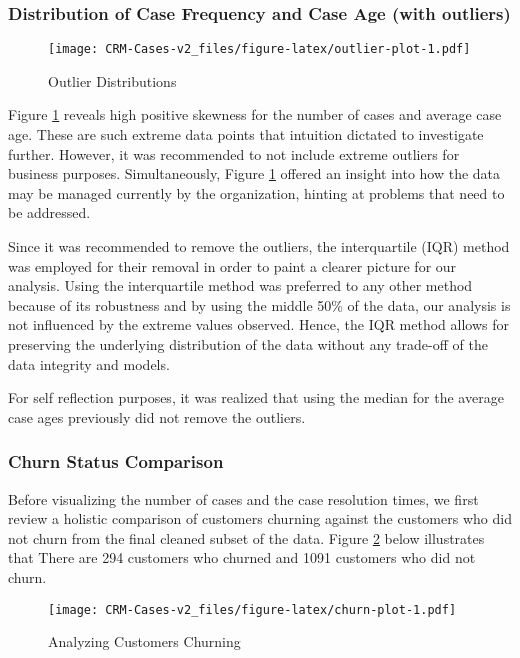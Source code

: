 \documentclass[
]{article}
\begin{document}
\subsubsection{Distribution of Case Frequency and Case Age (with outliers)}\label{distribution-of-case-frequency-and-case-age-with-outliers}

\begin{figure}
\centering
\texttt{[image: CRM-Cases-v2\_files/figure-latex/outlier-plot-1.pdf]}
\caption{\label{fig:outlier-plot}Outlier Distributions}
\end{figure}

Figure \ref{fig:outlier-plot} reveals high positive skewness for the number of cases and average case age. These are such extreme data points that intuition dictated to investigate further. However, it was recommended to not include extreme outliers for business purposes. Simultaneously, Figure \ref{fig:outlier-plot} offered an insight into how the data may be managed currently by the organization, hinting at problems that need to be addressed.

Since it was recommended to remove the outliers, the interquartile (IQR) method was employed for their removal in order to paint a clearer picture for our analysis. Using the interquartile method was preferred to any other method because of its robustness and by using the middle 50\% of the data, our analysis is not influenced by the extreme values observed. Hence, the IQR method allows for preserving the underlying distribution of the data without any trade-off of the data integrity and models.

For self reflection purposes, it was realized that using the median for the average case ages previously did not remove the outliers.

\subsubsection{Churn Status Comparison}\label{churn-status-comparison}

Before visualizing the number of cases and the case resolution times, we first review a holistic comparison of customers churning against the customers who did not churn from the final cleaned subset of the data. Figure \ref{fig:churn-plot} below illustrates that There are 294 customers who churned and 1091 customers who did not churn.

\begin{figure}
\centering
\texttt{[image: CRM-Cases-v2\_files/figure-latex/churn-plot-1.pdf]}
\caption{\label{fig:churn-plot}Analyzing Customers Churning}
\end{figure}
\end{document}
